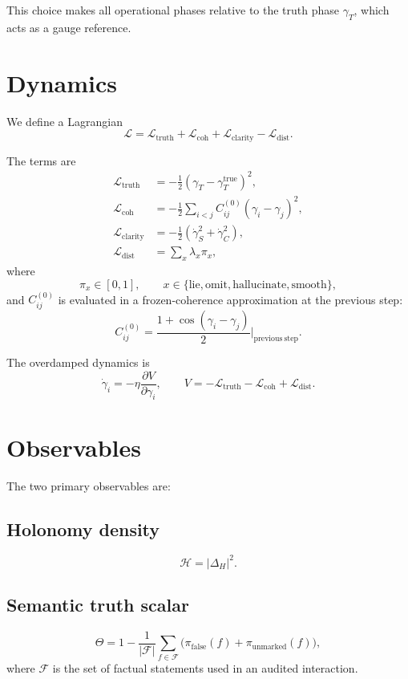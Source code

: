 \documentclass[12pt,a4paper]{article}
\begin{document}
This choice makes all operational phases relative to the truth phase $\gamma_T$, which acts as a gauge reference.

\section{Dynamics}

We define a Lagrangian
\[
\mathcal{L} = \mathcal{L}_{\mathrm{truth}} + \mathcal{L}_{\mathrm{coh}} + \mathcal{L}_{\mathrm{clarity}} - \mathcal{L}_{\mathrm{dist}}.
\]

The terms are
\begin{align}
\mathcal{L}_{\mathrm{truth}} &= -\frac12(\gamma_T-\gamma_T^{\mathrm{true}})^2,\\
\mathcal{L}_{\mathrm{coh}} &= -\frac12\sum_{i<j} C_{ij}^{(0)}(\gamma_i-\gamma_j)^2,\\
\mathcal{L}_{\mathrm{clarity}} &= -\frac12(\dot\gamma_S^2+\dot\gamma_C^2),\\
\mathcal{L}_{\mathrm{dist}} &= \sum_x \lambda_x \pi_x,
\end{align}
where
\[
\pi_x\in[0,1], \qquad x\in\{\mathrm{lie,omit,hallucinate,smooth}\},
\]
and $C_{ij}^{(0)}$ is evaluated in a frozen-coherence approximation at the previous step:
\[
C_{ij}^{(0)}=\frac{1+\cos(\gamma_i-\gamma_j)}{2}\Big|_{\mathrm{previous\ step}}.
\]

The overdamped dynamics is
\[
\dot\gamma_i = -\eta \frac{\partial V}{\partial \gamma_i},
\qquad
V=-\mathcal{L}_{\mathrm{truth}}-\mathcal{L}_{\mathrm{coh}}+\mathcal{L}_{\mathrm{dist}}.
\]

\section{Observables}

The two primary observables are:

\subsection{Holonomy density}
\[
\mathcal{H}=|\Delta_H|^2.
\]

\subsection{Semantic truth scalar}
\[
\Theta = 1-\frac{1}{|\mathcal{F}|}\sum_{f\in\mathcal{F}}
\bigl(\pi_{\mathrm{false}}(f)+\pi_{\mathrm{unmarked}}(f)\bigr),
\]
where $\mathcal{F}$ is the set of factual statements used in an audited interaction.
\end{document}
